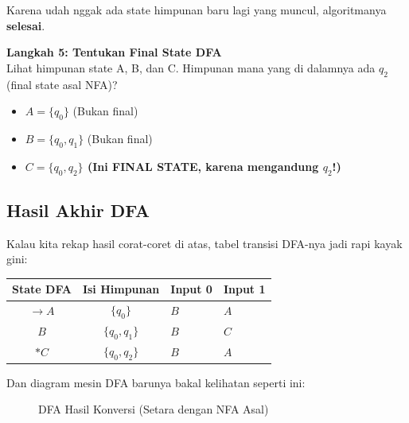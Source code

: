 \documentclass[12pt,a4paper]{article}
\begin{document}
Karena udah nggak ada state himpunan baru lagi yang muncul, algoritmanya \textbf{selesai}.

\textbf{Langkah 5: Tentukan Final State DFA} \\
Lihat himpunan state A, B, dan C. Himpunan mana yang di dalamnya ada $q_2$ (final state asal NFA)?
\begin{itemize}
    \item $A = \{q_0\}$ (Bukan final)
    \item $B = \{q_0, q_1\}$ (Bukan final)
    \item \textbf{$C = \{q_0, q_2\}$ (Ini FINAL STATE, karena mengandung $q_2$!)}
\end{itemize}

\subsection{Hasil Akhir DFA}
Kalau kita rekap hasil corat-coret di atas, tabel transisi DFA-nya jadi rapi kayak gini:

\begin{table}[h]
\centering
\begin{tabular}{@{}ccll@{}}
\toprule
\textbf{State DFA} & \textbf{Isi Himpunan} & \textbf{Input 0} & \textbf{Input 1} \\ \midrule
$\rightarrow A$ & $\{q_0\}$ & $B$ & $A$ \\
$B$ & $\{q_0, q_1\}$ & $B$ & $C$ \\
$*C$ & $\{q_0, q_2\}$ & $B$ & $A$ \\ \bottomrule
\end{tabular}
\end{table}

Dan diagram mesin DFA barunya bakal kelihatan seperti ini:
\begin{figure}[h]
    \centering
    \caption{DFA Hasil Konversi (Setara dengan NFA Asal)}
\end{figure}
\end{document}
